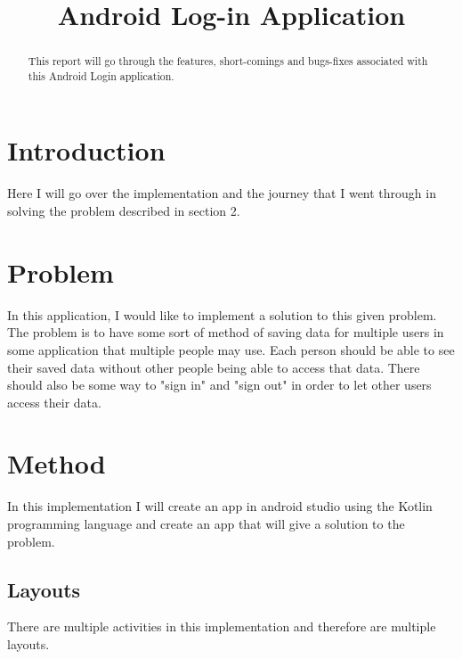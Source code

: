 \documentclass[conference]{IEEEtran}
\begin{document}
\title{Android Log-in Application}

\author{
}

\maketitle

\begin{abstract}
This report will go through the features, short-comings and bugs-fixes associated with 
this Android Login application.
\end{abstract}

\IEEEpeerreviewmaketitle

\section{Introduction}

Here I will go over the implementation and the journey that I went through in solving the problem described in section 2.

\section{Problem}
In this application, I would like to implement a solution to this given problem. The problem is to have some sort of method of saving data for multiple users in some application that multiple people may use. Each person should be able to see their saved data without other people being able to access that data. There should also be some way to "sign in" and "sign out" in order to let other users access their data.

\section{Method}
In this implementation I will create an app in android studio using the Kotlin programming language and create an app that will give a solution to the problem. 

\subsection{Layouts}

There are multiple activities in this implementation and therefore are multiple layouts. 
\end{document}
